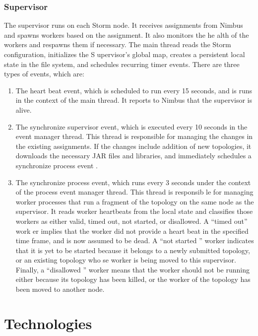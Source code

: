 \documentclass[9pt,twocolumn,twoside]{../../styles/osajnl}
\begin{document}
\subsubsection{Supervisor}


The supervisor runs on each Storm node. It receives assignments from
Nimbus and spawns workers based on the assignment. It also monitors
the he alth of the workers and respawns them if necessary. The main
thread reads the Storm configuration, initializes the S upervisor’s
global map, creates a persistent local state in the file system, and
schedules recurring timer events. There are three types of events,
which are:

\begin{enumerate}
\item The heart beat event, which is scheduled to run every 15
  seconds, and is runs in the context of the main thread. It reports
  to Nimbus that the supervisor is alive.
\item The synchronize supervisor event, which is executed every 10
  seconds in the event manager thread. This thread is responsible for
  managing the changes in the existing assignments. If the changes
  include addition of new topologies, it downloads the necessary JAR
  files and libraries, and immediately schedules a synchronize process
  event .
\item The synchronize process event, which runs every 3 seconds under
  the context of the process event manager thread. This thread is
  responsib le for managing worker processes that run a fragment of
  the topology on the same node as the supervisor. It reads worker
  heartbeats from the local state and classifies those workers as
  either valid, timed out, not started, or disallowed. A “timed out”
  work er implies that the worker did not provide a heart beat in the
  specified time frame, and is now assumed to be dead. A “not started
  ” worker indicates that it is yet to be started because it belongs
  to a newly submitted topology, or an existing topology who se worker
  is being moved to this supervisor. Finally, a “disallowed ” worker
  means that the worker should not be running either because its
  topology has been killed, or the worker of the topology has been
  moved to another node.\\
\end{enumerate}




\section{Technologies}
\end{document}
